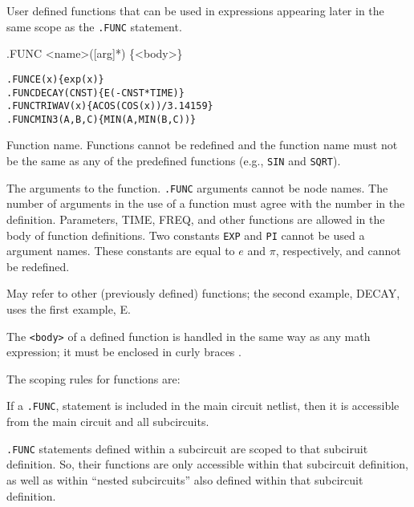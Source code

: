


User defined functions that can be used in expressions appearing later
in the same scope as the \texttt{.FUNC} statement.

\begin{Command}
\format
.FUNC <name>([arg]*) \{<body>\}

\examples
\begin{alltt}
.FUNC E(x) \{exp(x)\}
.FUNC DECAY(CNST) \{E(-CNST*TIME)\}
.FUNC TRIWAV(x) \{ACOS(COS(x))/3.14159\}
.FUNC MIN3(A,B,C) \{MIN(A,MIN(B,C))\}
\end{alltt}

\arguments

\begin{Arguments}

Function name.  Functions cannot be redefined and the function name must 
not be the same as any of the
predefined functions (e.g., \texttt{SIN} and \texttt{SQRT}).  


The arguments to the function.  \texttt{.FUNC} arguments cannot be node names.
The number of arguments in the use of a function must agree with the number 
in the definition. Parameters, TIME, FREQ, and other functions are allowed in 
the body of function definitions.  
Two constants \texttt{EXP} and \texttt{PI} cannot
be used a argument names.  These constants are equal to $e$ and $\pi$, respectively,
and cannot be redefined.


May refer to other (previously defined) functions; the second example, 
DECAY, uses the first example, E. 

\end{Arguments}

\comments

The \texttt{<body>} of a defined function is handled in the same way as any 
math expression; it must be enclosed in curly braces {}.

The scoping rules for functions are:
\begin{XyceItemize}
\item If a \texttt{.FUNC}, statement is included in the main circuit 
netlist, then it is accessible from the main circuit and all subcircuits. 
\item \texttt{.FUNC} statements defined within a subcircuit are scoped 
to that subciruit definition.  So, their functions are only accessible within 
that subcircuit definition, as well as within ``nested subcircuits'' also 
defined within that subcircuit definition.
\end{XyceItemize}


\end{Command}
